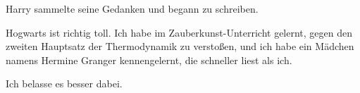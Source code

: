 Harry sammelte seine Gedanken und begann zu schreiben.

\begin{writtenNote}

Hogwarts ist richtig toll. Ich habe im Zauberkunst-Unterricht gelernt, gegen den zweiten Hauptsatz der Thermodynamik zu verstoßen, und ich habe ein Mädchen namens Hermine Granger kennengelernt, die schneller liest als ich.

Ich belasse es besser dabei.


\end{writtenNote}

